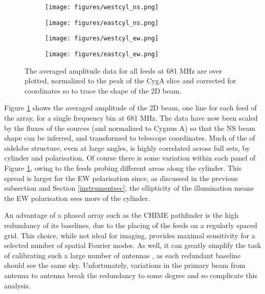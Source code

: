 \begin{figure}[ht] %
	\centering
	\begin{subfigure}[b]{0.49\textwidth}
		\texttt{[image: figures/westcyl\_ns.png]}%
	\end{subfigure}
	\begin{subfigure}[b]{0.465\textwidth}
		\texttt{[image: figures/eastcyl\_ns.png]}%
	\end{subfigure}
	\begin{subfigure}[b]{0.49\textwidth}
		\texttt{[image: figures/westcyl\_ew.png]}%
	\end{subfigure}
	\begin{subfigure}[b]{0.46\textwidth}
		\texttt{[image: figures/eastcyl\_ew.png]}%
	\end{subfigure}
\caption{The averaged amplitude data for all feeds at 681 MHz are over plotted, normalized to the peak of the CygA slice and corrected for coordinates so to trace the shape of the 2D beam. }
\label{allfeeds}
\end{figure}

Figure \ref{allfeeds} shows the averaged amplitude of the 2D beam, one line for each feed of the array, for a single frequency bin at 681 MHz. The data have now been scaled by the fluxes of the sources (and normalized to Cygnus A) so that the NS beam shape can be inferred, and transformed to telescope coordinates. Much of the of sidelobe structure, even at large angles, is highly correlated across full sets, by cylinder and polarisation. Of course there is some variation within each panel of Figure \ref{allfeeds}, owing to the feeds probing different areas along the cylinder. This spread is larger for the EW polarisation since, as discussed in the previous subsection and Section \ref{instrumentsec}, the ellipticity of the illumination means the EW polarisation sees more of the cylinder.

An advantage of a phased array such as the CHIME pathfinder is the high redundancy of its baselines, due to the placing of the feeds on a regularly spaced grid. This choice, while not ideal for imaging, provides maximal sensitivity for a selected number of spatial Fourier modes. As well, it can greatly simplify the task of calibrating such a large number of antennas \citep{redundantbaselines}, as each redundant baseline should see the same sky. Unfortunately, variations in the primary beam from antenna to antenna break the redundancy to some degree and so complicate this analysis.

